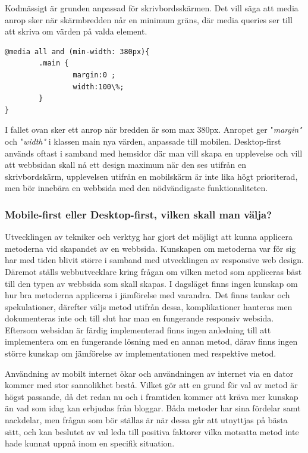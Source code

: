 \documentclass[11pt]{article}
\begin{document}
Kodmässigt är grunden anpassad för skrivbordsskärmen. Det vill säga att media anrop sker när skärmbredden når en minimum gräns, där media queries ser till att skriva om värden på valda element.


\vspace{0.5cm}
 \begin{verbatim}
@media all and (min-width: 380px){
        .main {
                margin:0 ;
                width:100\%;
        }
}
\end{verbatim}
\vspace{0.5cm}

I fallet ovan sker ett anrop när bredden är som max 380px. Anropet ger "\textit{margin"} och "\textit{width"} i klassen main nya värden, anpassade till mobilen.  Desktop-first används oftast i samband med hemsidor där man vill skapa en upplevelse och vill att webbsidan skall nå ett design maximum när den ses utifrån en skrivbordskärm, upplevelsen utifrån en mobilskärm är inte lika högt prioriterad, men bör innebära en webbsida med den nödvändigaste funktionaliteten.

\subsubsection{Mobile-first eller Desktop-first, vilken skall man välja?}
Utvecklingen av tekniker och verktyg har gjort det möjligt att kunna applicera metoderna vid skapandet av en webbsida. Kunskapen om metoderna var för sig har med tiden blivit större i samband med utvecklingen av responsive web design. Däremot ställs webbutvecklare kring frågan om vilken metod som appliceras bäst till den typen av webbsida som skall skapas. I dagsläget finns ingen kunskap om hur bra metoderna appliceras i jämförelse med varandra. Det finns tankar och spekulationer, därefter väljs metod utifrån dessa, komplikationer hanteras men dokumenteras inte och till slut har man en fungerande responsiv websida. Eftersom websidan är färdig implementerad finns ingen anledning till att implementera om en fungerande lösning med en annan metod, därav finns ingen större kunskap om jämförelse av implementationen med respektive metod.

Användning av mobilt internet ökar och användningen av internet via en dator kommer med stor sannolikhet bestå. Vilket gör att en grund för val av metod är högst passande, då det redan nu och i framtiden kommer att kräva mer kunskap än vad som idag kan erbjudas från bloggar. Båda metoder har sina fördelar samt nackdelar, men frågan som bör ställas är när dessa går att utnyttjas på bästa sätt, och kan beslutet av val leda till positiva faktorer vilka motsatta metod inte hade kunnat uppnå inom en specifik situation.
\end{document}
